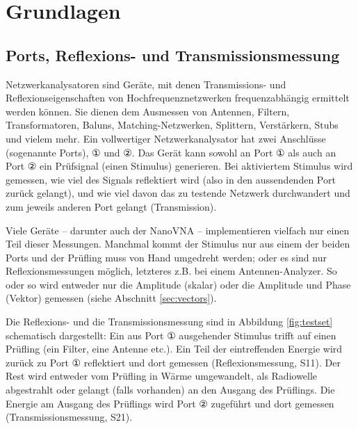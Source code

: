 \documentclass[twoside,a4paper,11pt,halfparskip,DIV=11,notitlepage]{scrartcl}
\begin{document}
\section{Grundlagen}

\subsection{Ports, Reflexions- und Transmissionsmessung}\label{sec:ports}
Netzwerkanalysatoren sind Geräte, mit denen Transmissions- und
Reflexionseigenschaften von Hochfrequenznetzwerken frequenzabhängig ermittelt
werden können. Sie dienen dem Ausmessen von Antennen, Filtern, Transformatoren,
Baluns, Matching-Netzwerken, Splittern, Verstärkern, Stubs und vielem mehr. Ein
vollwertiger Netzwerkanalysator hat zwei Anschlüsse (sogenannte Ports), ① und ②.
Das Gerät kann sowohl an Port ① als auch an Port ② ein Prüfsignal (einen 
Stimulus) generieren. Bei aktiviertem Stimulus wird gemessen, wie viel des
Signals reflektiert wird (also in den aussendenden Port zurück gelangt), und
wie viel davon das zu testende Netzwerk durchwandert und zum jeweils anderen
Port gelangt (Transmission).

Viele Geräte -- darunter auch der NanoVNA -- implementieren vielfach nur einen Teil
dieser Messungen. Manchmal kommt der Stimulus nur aus einem der beiden Ports
und der Prüfling muss von Hand umgedreht werden; oder es sind nur
Reflexionsmessungen möglich, letzteres z.B. bei einem Antennen-Analyzer. So
oder so wird entweder nur die Amplitude (skalar) oder die Amplitude und Phase
(Vektor) gemessen (siehe Abschnitt \ref{sec:vectors}).

Die Reflexions- und die Transmissionsmessung sind in
Abbildung \ref{fig:testset} schematisch dargestellt: Ein aus Port ① ausgehender
Stimulus trifft auf einen Prüfling (ein Filter, eine Antenne etc.). Ein Teil
der eintreffenden Energie wird zurück zu Port ① reflektiert und dort gemessen
(Reflexionsmessung, S11). Der Rest wird entweder vom Prüfling in Wärme umgewandelt,
als Radiowelle abgestrahlt oder gelangt (falls vorhanden) an den Ausgang des
Prüflings. Die Energie am Ausgang des Prüflings wird Port ② zugeführt
und dort gemessen (Transmissionsmessung, S21).
\end{document}
